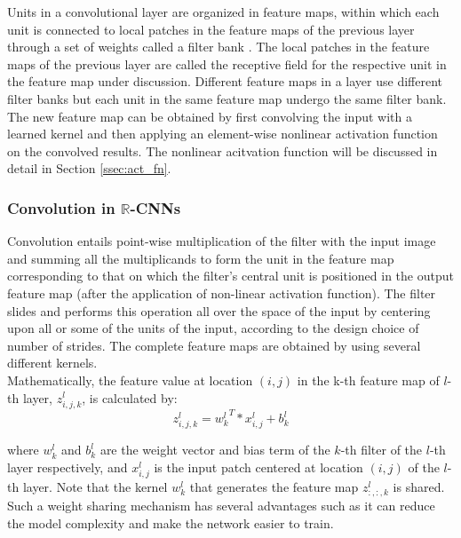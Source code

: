  
 Units in a convolutional layer are organized in feature maps, within which each unit is connected to local patches in the feature maps of the previous  layer through a set of weights called a filter bank \cite{nature}.  The local patches in the feature maps of the previous layer are called the receptive field for the respective unit in the feature map under discussion. Different feature maps in a layer use different filter banks but each unit in the same feature map undergo the same filter bank. The new feature map can be obtained by first convolving the input with a learned kernel and then applying an element-wise nonlinear activation function on the convolved results\cite{recent_advances}. The nonlinear acitvation function will be discussed in detail in Section \ref{ssec:act_fn}. 
 
 
 \subsubsection{Convolution in $\mathbb{R}$-CNNs}
 Convolution entails point-wise multiplication of the filter with the input image and summing all the multiplicands to form the unit in the feature map corresponding to that on which the filter's central unit is positioned in the output feature map (after the application of non-linear activation function). The filter slides and performs this operation all over the space of the input by centering upon all or some of the units of the input, according to the design choice of number of strides. The complete feature maps are obtained by using several different kernels. \\
 
 Mathematically, the feature value at location $(i, j)$ in the k-th feature map of $l$-th layer, $z_{i,j,k}^l$, is calculated by:
 \begin{equation}
 z_{i,j,k}^l= {w_{k}^l}^T*x^l_{i,j} + b^l_k
 \end{equation}
 
 
 where $w_k^{l}$ and $b_k^{l}$ are the weight vector and bias term of the $k$-th filter of the $l$-th layer respectively, and
 $x^l_{i,j}$ is the input patch centered at location $(i, j)$ of the $l$-th layer. Note that the kernel $w_k^{l}$ that generates
 the feature map $z^l_{:,:,k}$ is shared. Such a weight sharing mechanism has several advantages such as it can reduce the model complexity and make the network easier to train\cite{recent_advances}. 
 
